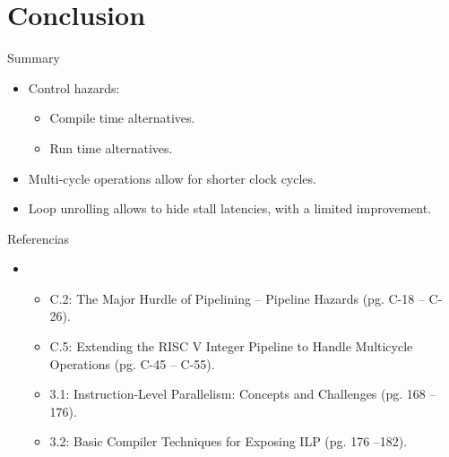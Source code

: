 \section{Conclusion}

\begin{frame}[t]{Summary}
\begin{itemize}
  \item Control hazards:
    \begin{itemize}
      \item Compile time alternatives.
      \item Run time alternatives.
    \end{itemize}

  \item Multi-cycle operations allow for shorter clock cycles.

  \item Loop unrolling allows to hide stall latencies, with a limited improvement.

\end{itemize}
\end{frame}


\begin{frame}[t]{Referencias}
\begin{itemize}
  \item \bibhennessy
    \begin{itemize}
      \item C.2: The Major Hurdle of Pipelining -- Pipeline Hazards (pg. C-18 -- C-26).
      \item C.5: Extending the RISC V Integer Pipeline to Handle Multicycle Operations (pg. C-45 -- C-55).
      \item 3.1: Instruction-Level Parallelism: Concepts and Challenges (pg. 168 -- 176).
      \item 3.2: Basic Compiler Techniques for Exposing ILP (pg. 176 --182).
    \end{itemize}

\end{itemize}
\end{frame}

